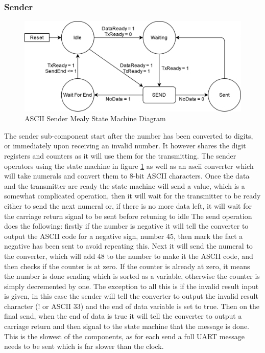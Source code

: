 \documentclass[11pt]{article}
\begin{document}
\subsubsection{Sender}
\begin{figure}[H]        
    \centering
    \includegraphics[width=.66\textwidth]{SenderSM.drawio.png}
    \caption{ASCII Sender Mealy State Machine Diagram}
    \label{fig:sendersm}
\end{figure} 

The sender sub-component start after the number has been converted to digits, or immediately upon receiving an invalid number. 
It however shares the digit registers and counters as it will use them for the transmitting.
The sender operators using the state machine in figure \ref{fig:sendersm} as well as an ascii converter which will take numerals and convert them to 8-bit ASCII characters.
Once the data and the transmitter are ready the state machine will send a value, which is a somewhat complicated operation,
then it will wait for the transmitter to be ready either to send the next numeral or, if there is no more data left, it will wait for the carriage return signal to be sent before retuning to idle
The send operation does the following: firstly if the number is negative it will tell the converter to output the ASCII code for a negative sign, number 45, then mark the fact a negative has been sent to avoid repeating this.
Next it will send the numeral to the converter, which will add 48 to the number to make it the ASCII code, and then checks if the counter is at zero.
If the counter is already at zero, it means the number is done sending which is sorted as a variable, otherwise the counter is simply decremented by one.
The exception to all this is if the invalid result input is given, in this case the sender will tell the converter to output the invalid result character (! or ASCII 33) and the end of data variable is set to true.
Then on the final send, when the end of data is true it will tell the converter to output a carriage return and then signal to the state machine that the message is done.
This is the slowest of the components, as for each send a full UART message needs to be sent which is far slower than the clock.
\end{document}
